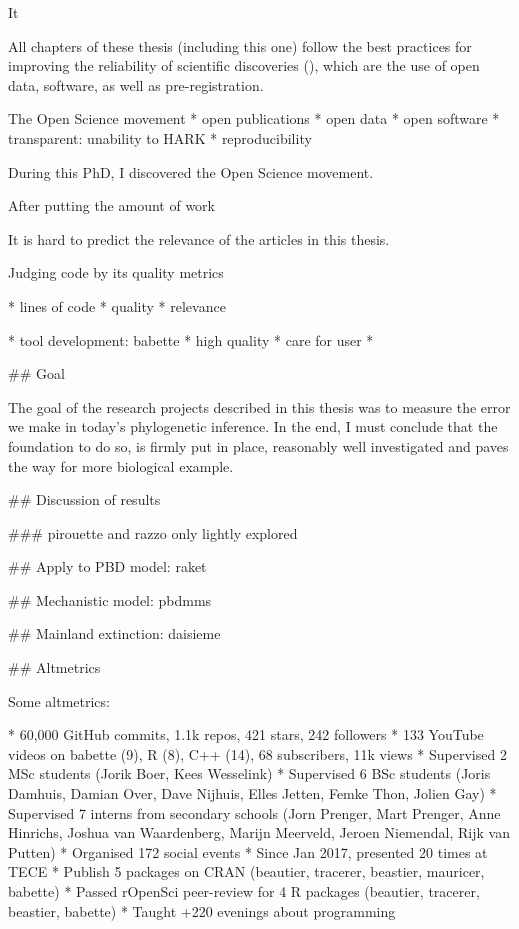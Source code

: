 It 



All chapters of these thesis (including this one) follow the best
practices for improving the reliability of scientific 
discoveries (\cite{munafo2017manifesto}), which are the
use of open data, software, as well as pre-registration.








\cite{nosek2015promoting}

The Open Science movement 
 * open publications
 * open data
 * open software
 * transparent: unability to HARK
 * reproducibility


During this PhD, I discovered the Open Science movement. 



After putting the amount of work 

It is hard to predict the relevance of the articles in this thesis.











Judging code by its quality
metrics 

 * lines of code
 * quality
 * relevance



 * tool development: babette
 * high quality
 * care for user
 * 




## Goal 

The goal of the research projects
described in this thesis
was to measure the error we make in today's phylogenetic inference.
In the end, I must conclude that the foundation to do so, is firmly 
put in place, reasonably well investigated and paves the way for
more biological example.

## Discussion of results

### pirouette and razzo only lightly explored


## Apply to PBD model: raket

## Mechanistic model: pbdmms

## Mainland extinction: daisieme

## Altmetrics

Some altmetrics:

 * 60,000 GitHub commits, 1.1k repos, 421 stars, 242 followers
 * 133 YouTube videos on babette (9), R (8), C++ (14), 68 subscribers, 11k views
 * Supervised 2 MSc students (Jorik Boer, Kees Wesselink)
 * Supervised 6 BSc students (Joris Damhuis, 
   Damian Over, Dave Nijhuis, Elles Jetten, Femke Thon, Jolien Gay)
 * Supervised 7 interns from secondary schools (Jorn Prenger, Mart Prenger, 
   Anne Hinrichs, Joshua van Waardenberg, Marijn Meerveld, Jeroen Niemendal, 
   Rijk van Putten)
 * Organised 172 social events
 * Since Jan 2017, presented 20 times at TECE
 * Publish 5 packages on CRAN (beautier, tracerer, beastier, mauricer, babette)
 * Passed rOpenSci peer-review for 4 R packages (beautier, tracerer, beastier, babette)
 * Taught +220 evenings about programming

